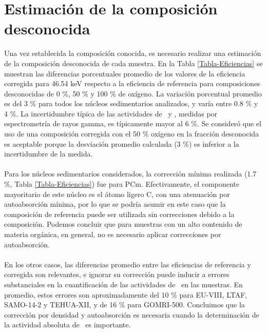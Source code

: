 	\section{Estimación de la composición desconocida}\label{Secc-EstimacionComposicion}
Una vez establecida la composición conocida, es necesario realizar una estimación de la composición desconocida de cada muestra. En la Tabla \ref{Tabla-Eficiencias} se muestran las diferencias porcentuales promedio de los valores de la eficiencia corregida para 46.54 keV respecto a la eficiencia de referencia para composiciones desconocidas de 0 \%, 50 \% y 100 \% de oxígeno. La variación porcentual promedio es del 3 \% para todos los núcleos sedimentarios analizados, y varía entre 0.8 \% y 4 \%. La incertidumbre típica de las actividades de \PbCero\, y \PbCuatro, medidas por espectrometría de rayos gamma, es típicamente mayor al 6 \%. Se consideró que el uso de una composición corregida con el 50 \% oxígeno en la fracción desconocida es aceptable porque la desviación promedio calculada (3 \%) es inferior a la incertidumbre de la medida.
\\
\\
Para los núcleos sedimentarios considerados, la corrección mínima realizada (1.7 \%, Tabla \ref{Tabla-Eficiencias}) fue para PCm. Efectivamente, el componente mayoritario de este núcleo es el átomo ligero C, con una atenuación por autoabsorción mínima, por lo que se podría asumir en este caso que la composición de referencia puede ser utilizada sin correcciones debido a la composición. Podemos concluir que para muestras con un alto contenido de materia orgánica, en general, no es necesario aplicar correcciones por autoabsorción.
\\ \\ 
En los otros casos, las diferencias promedio entre las eficiencias de referencia y corregida son relevantes, e ignorar su corrección puede inducir a errores substanciales en la cuantificación de las actividades de \PbCero\, en las muestras. En promedio, estos errores son aproximadamente del 10 \% para EU-VIII, LTAF, SAMO-14-2 y TEHUA-XII, y de 16 \% para GOMRI-500. Concluimos que la corrección por densidad y autoabsorción es necesaria cuando la determinación de la actividad absoluta de \PbCero\, es importante.
